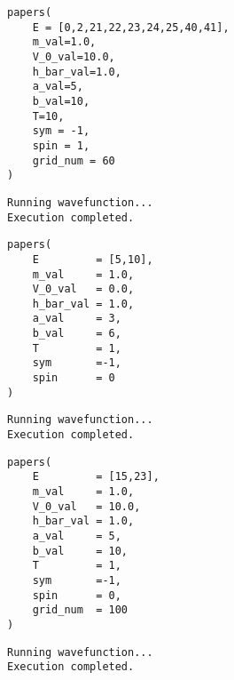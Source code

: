 \documentclass[11pt]{article}
\begin{document}
\begin{center}

\end{center}

\begin{verbatim}
papers(
    E = [0,2,21,22,23,24,25,40,41],
    m_val=1.0,
    V_0_val=10.0,
    h_bar_val=1.0,
    a_val=5,
    b_val=10,
    T=10,
    sym = -1,
    spin = 1,
    grid_num = 60
)
\end{verbatim}

\label{orgd1bf213}
\begin{verbatim}
Running wavefunction...
Execution completed.
\end{verbatim}

\begin{center}

\end{center}

\begin{verbatim}
papers(
    E         = [5,10],
    m_val     = 1.0,
    V_0_val   = 0.0,
    h_bar_val = 1.0,
    a_val     = 3,
    b_val     = 6,
    T         = 1,
    sym       =-1,
    spin      = 0
)
\end{verbatim}

\label{orgdde20d9}
\begin{verbatim}
Running wavefunction...
Execution completed.
\end{verbatim}

\begin{center}

\end{center}

\begin{verbatim}
papers(
    E         = [15,23],
    m_val     = 1.0,
    V_0_val   = 10.0,
    h_bar_val = 1.0,
    a_val     = 5,
    b_val     = 10,
    T         = 1,
    sym       =-1,
    spin      = 0,
    grid_num  = 100
)
\end{verbatim}

\label{orgf259aef}
\begin{verbatim}
Running wavefunction...
Execution completed.
\end{verbatim}
\end{document}
